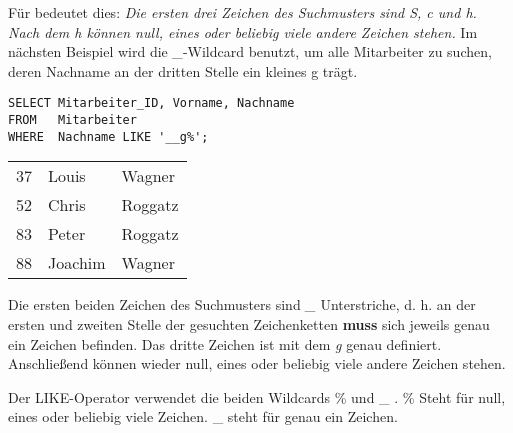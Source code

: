 Für  bedeutet dies: \textit{Die ersten drei Zeichen des Suchmusters sind S, c und h. Nach dem h können null, eines oder beliebig viele andere Zeichen stehen.} Im nächsten Beispiel wird die \textit{\_}-Wildcard benutzt, um alle Mitarbeiter zu suchen, deren Nachname an der dritten Stelle ein kleines g trägt.
\begin{lstlisting}[language=oracle_sql,caption={Zeichenkettensuche mit einem etwas komplexeren Suchmuster},label=sql02_09]
SELECT Mitarbeiter_ID, Vorname, Nachname
FROM   Mitarbeiter
WHERE  Nachname LIKE '__g%';
          \end{lstlisting}
\clearpage
\begin{center}
    \begin{small}
        \tablehead{}
        \begin{msoraclesql}
            \begin{supertabular}{rll}
                37 & Louis & Wagner \\
                52 & Chris & Roggatz \\
                83 & Peter & Roggatz \\
                88 & Joachim & Wagner \\
            \end{supertabular}
        \end{msoraclesql}
    \end{small}
\end{center}
Die ersten beiden Zeichen des Suchmusters sind \textit{\_} Unterstriche, d. h. an der ersten und zweiten Stelle der gesuchten Zeichenketten \textbf{muss} sich jeweils genau ein Zeichen befinden. Das dritte Zeichen ist mit dem \textit{g} genau definiert. Anschließend können wieder null, eines oder beliebig viele andere Zeichen stehen.

\begin{merke}
    Der LIKE-Operator verwendet die beiden Wildcards \% und \_ . \% Steht für null, eines oder beliebig viele Zeichen. \_ steht für genau ein Zeichen.
\end{merke}
